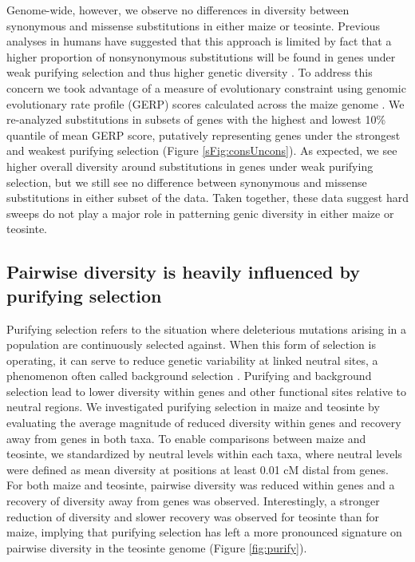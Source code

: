 \documentclass{pnastwo}
\begin{document}
\begin{article}
Genome-wide, however, we observe no differences in diversity between synonymous and missense substitutions in either maize or teosinte.
Previous analyses in humans have suggested that this approach is limited by fact that a higher proportion of nonsynonymous substitutions will be found in genes under weak purifying selection and thus higher genetic diversity \cite{enard2014}. 
To address this concern we took advantage of a measure of evolutionary constraint using genomic evolutionary rate profile (GERP) scores \cite{davydov2010} calculated across the maize genome \cite{rodgers2015}. 
We re-analyzed substitutions in subsets of genes with the highest and lowest 10\% quantile of mean GERP score, putatively representing genes under the strongest and weakest purifying selection  (Figure \ref{sFig:consUncons}). 
As expected, we see higher overall diversity around substitutions in genes under weak purifying selection, but we still see no difference between synonymous and missense substitutions in either subset of the data.
Taken together, these data suggest hard sweeps do not play a major role in patterning genic diversity in either maize or teosinte.




\subsection{Pairwise diversity is heavily influenced by purifying selection}

Purifying selection refers to the situation where deleterious mutations arising in a population are continuously selected against.
When this form of selection is operating, it can serve to reduce genetic variability at linked neutral sites, a phenomenon often called background selection \cite{charlesworth1993}. Purifying and background selection lead to lower diversity within genes and other functional sites relative to neutral regions.
We investigated purifying selection in maize and teosinte by evaluating the average magnitude of reduced diversity within genes and recovery away from genes in both taxa.
To enable comparisons between maize and teosinte, we standardized by neutral levels within each taxa, where neutral levels were defined as mean diversity at positions at least 0.01 cM distal from genes. For both maize and teosinte, pairwise diversity was reduced within genes and a recovery of diversity away from genes was observed. Interestingly, a stronger reduction of diversity and slower recovery was observed for teosinte than for maize, implying that purifying selection has left a more pronounced signature on pairwise diversity in the teosinte genome (Figure \ref{fig:purify}).




\end{article}
\end{document}
